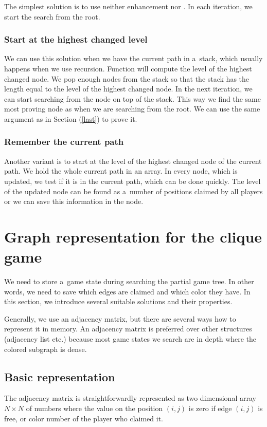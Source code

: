 The simplest solution is to use neither enhancement 
nor . In each iteration, we start the search from the root.

\subsubsection{Start at the highest changed level}

We can use this solution when we have the current path in a~stack, which usually
happens when we use recursion. Function  will compute the level of
the highest changed node. We pop enough nodes from the stack so that the stack has
the length equal to the level of the highest changed node. In the next iteration, we can
start searching from the node on top of the stack. This way
we find the same most proving node as when we are searching from the root. We can
use the same argument as in Section  (\ref{last}) to prove it.

\subsubsection{Remember the current path}

Another variant is to start at the level of the highest changed node of the current path.
We hold the whole current path in an array. In every
node, which is updated, we test if it is in the current path, which can be done
quickly. The level of the updated node can be found as a~number of positions
claimed by all players or we can save this information in the node.

\section{Graph representation for the clique game} 

We need to store a~game state during searching the partial game tree. In other words, we
need to save which edges are claimed and which color they have. In
this section, we introduce several suitable solutions and their properties.

Generally, we use an adjacency matrix, but there are several ways how to
represent it in memory. An adjacency matrix is preferred over other structures
(adjacency list etc.) because most game states we search are in depth where the
colored subgraph is dense.

\subsection{Basic representation}
The adjacency matrix is straightforwardly represented as two 
dimensional array $N \times N$ of numbers where the value on the position
$(i,j)$ is zero if edge $(i,j)$ is free, or color number of the player who claimed it.

